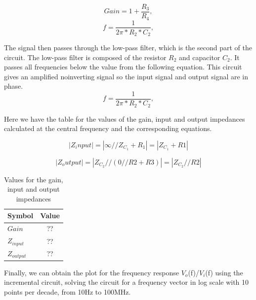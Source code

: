 \begin{equation}
  Gain = 1+ \frac{R_3}{R_4},
  \label{eq:gain}
\end{equation}
\begin{equation}
  {f} = \frac{1}{2\pi*R_2*C_2},
  \label{eq:f1}
\end{equation}

The signal then passes through the low-pass filter, which is the second part of the circuit. The low-pass filter is composed of the resistor $R_2$ and capacitor $C_2$. It passes all frequencies below the value from the following equation. This circuit gives an amplified noinverting signal so the input signal and output signal are in phase.
\begin{equation}
  {f} = \frac{1}{2\pi*R_2*C_2},
  \label{eq:f2}
\end{equation}



Here we have the table for the values of the gain, input and output impedances calculated at the central frequency and the corresponding equations. 


\begin{equation}
|Z_input| = |\infty // Z_{C_1} + R_1| = |Z_{C_1} + R1|
\label{eq:impendances1}
\end{equation}

\begin{equation}
|Z_output| = |Z_{C_2} // (0 // R2 + R3)| = |Z_{C_2} // R2|
\label{eq:impendances2}
\end{equation}

\begin{table}[h]
    \centering
    \begin{tabular}{|l|c|}
    \hline
    {\bf Symbol} & {\bf Value} \\ \hline
    $Gain$ & ?? \\ \hline
    $Z_{input}$ & ?? \\ \hline
    $Z_{output}$ & ??  \\ \hline

    \end{tabular}
    \caption{Values for the gain, input and output impedances}
    \label{tab:valuesimp}
\end{table}

Finally, we can obtain the plot for the frequency response $V_o$(f)/$V_i$(f) using the incremental circuit, solving the circuit for a frequency vector in log scale with 10 points per decade, from 10Hz to 100MHz.

